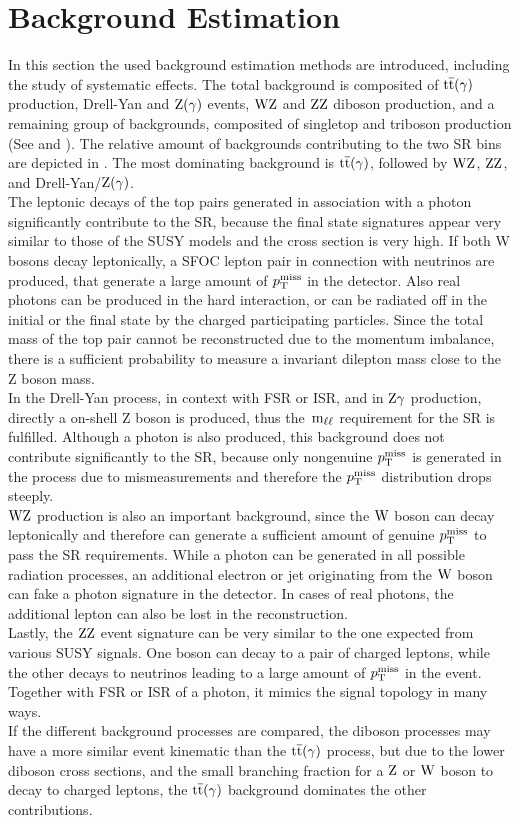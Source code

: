 \section{Background Estimation}\label{sec:BKG}
In this section the used background estimation methods are introduced, including the study of systematic effects. The total background is composited of ${\mathrm{t}\overline{\mathrm{t}}}(\gamma)$ production, Drell-Yan and $\mathrm{Z}(\gamma)$ events, $\mathrm{W}\mathrm{Z}$ and $\mathrm{Z}\mathrm{Z}$ diboson production, and a remaining group of backgrounds, composited of \eg singletop and triboson production (See  and ). The relative amount of backgrounds contributing to the two SR bins are depicted in . The most dominating background is ${\mathrm{t}\overline{\mathrm{t}}}(\gamma)$, followed by $\mathrm{W}\mathrm{Z}$, $\mathrm{Z}\mathrm{Z}$, and Drell-Yan/$\mathrm{Z}(\gamma)$.\\
The leptonic decays of the top pairs generated in association with a photon significantly contribute to the SR, because the final state signatures appear very similar to those of the SUSY models and the cross section is very high. If both W bosons decay leptonically, a SFOC lepton pair in connection with neutrinos are produced, that generate a large amount of $p_{\mathrm{T}}^\text{miss}$ in the detector. Also real photons can be produced in the hard interaction, or can be radiated off in the initial or the final state by the charged participating particles. Since the total mass of the top pair cannot be reconstructed due to the momentum imbalance, there is a sufficient probability to measure a invariant dilepton mass close to the Z boson mass.\\
In the Drell-Yan process, in context with FSR or ISR, and in $\mathrm{Z}\gamma$ production, directly a on-shell Z boson is produced, thus the $\,\text{m}_{\ell\ell}$ requirement for the SR is fulfilled. Although a photon is also produced, this background does not contribute significantly to the SR, because only nongenuine $p_{\mathrm{T}}^\text{miss}$ is generated in the process due to mismeasurements and therefore the $p_{\mathrm{T}}^\text{miss}$ distribution drops steeply.\\
$\mathrm{W}\mathrm{Z}$ production is also an important background, since the $\mathrm{W}$ boson can decay leptonically and therefore can generate a sufficient amount of genuine $p_{\mathrm{T}}^\text{miss}$ to pass the SR requirements. While a photon can be generated in all possible radiation processes, an additional electron or jet originating from the $\mathrm{W}$ boson can fake a photon signature in the detector. In cases of real photons, the additional lepton can also be lost in the reconstruction.\\
Lastly, the $\mathrm{Z}\mathrm{Z}$ event signature can be very similar to the one expected from various SUSY signals. One boson can decay to a pair of charged leptons, while the other decays to neutrinos leading to a large amount of $p_{\mathrm{T}}^\text{miss}$ in the event. Together with FSR or ISR of a photon, it mimics the signal topology in many ways.\\
If the different background processes are compared, the diboson processes may have a more similar event kinematic than the ${\mathrm{t}\overline{\mathrm{t}}}(\gamma)$ process, but due to the lower diboson cross sections, and the small branching fraction for a $\mathrm{Z}$ or $\mathrm{W}$ boson to decay to charged leptons, the ${\mathrm{t}\overline{\mathrm{t}}}(\gamma)$ background dominates the other contributions.\\

